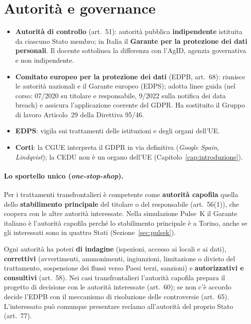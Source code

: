 \section{Autorità e governance}
\label{sec:gdpr-autorita}

\begin{itemize}
  \item \textbf{Autorità di controllo} (art.~51): autorità pubblica \textbf{indipendente} istituita da
    ciascuno Stato membro; in Italia il \textbf{Garante per la protezione dei dati personali}. Il docente
    sottolinea la differenza con l'AgID, agenzia governativa e non indipendente.
  \item \textbf{Comitato europeo per la protezione dei dati} (EDPB, art.~68): riunisce le autorità
    nazionali e il Garante europeo (EDPS); adotta linee guida (nel corso: 07/2020 su titolare e
    responsabile, 9/2022 sulla notifica dei data breach) e assicura l'applicazione coerente del GDPR.
    Ha sostituito il Gruppo di lavoro Articolo~29 della Direttiva 95/46.
  \item \textbf{EDPS}: vigila sui trattamenti delle istituzioni e degli organi dell'UE.
  \item \textbf{Corti}: la CGUE interpreta il GDPR in via definitiva (\emph{Google Spain},
    \emph{Lindqvist}); la CEDU non è un organo dell'UE (Capitolo~\ref{cap:introduzione}).
\end{itemize}

\paragraph{Lo sportello unico (\emph{one-stop-shop}).} Per i trattamenti transfrontalieri è competente
come \textbf{autorità capofila} quella dello \textbf{stabilimento principale} del titolare o del
responsabile (art.~56(1)), che coopera con le altre autorità interessate. Nella simulazione Pulse~K il
Garante italiano è l'autorità capofila perché lo stabilimento principale è a Torino, anche se gli
interessati sono in quattro Stati (Sezione~\ref{sec:pulsek}).

\begin{integrazione}
Ogni autorità ha poteri \textbf{di indagine} (ispezioni, accesso ai locali e ai dati), \textbf{correttivi}
(avvertimenti, ammonimenti, ingiunzioni, limitazione o divieto del trattamento, sospensione dei flussi
verso Paesi terzi, sanzioni) e \textbf{autorizzativi e consultivi} (art.~58). Nei casi transfrontalieri
l'autorità capofila prepara il progetto di decisione con le autorità interessate (art.~60); se non c'è
accordo decide l'EDPB con il meccanismo di risoluzione delle controversie (art.~65). L'interessato può
comunque presentare reclamo all'autorità del proprio Stato (art.~77).
\end{integrazione}

